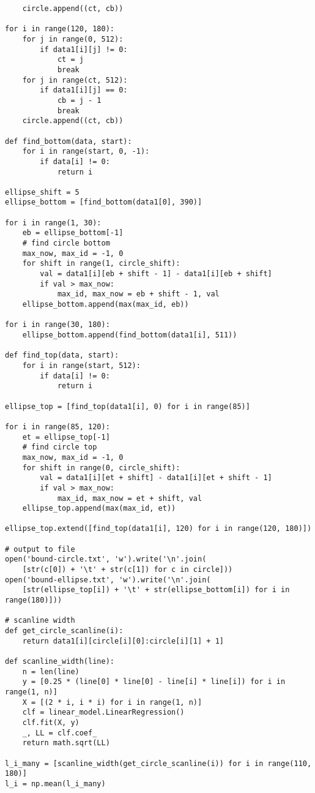 \begin{verbatim}
    circle.append((ct, cb))

for i in range(120, 180):
    for j in range(0, 512):
        if data1[i][j] != 0:
            ct = j
            break
    for j in range(ct, 512):
        if data1[i][j] == 0:
            cb = j - 1
            break
    circle.append((ct, cb))

def find_bottom(data, start):
    for i in range(start, 0, -1):
        if data[i] != 0:
            return i

ellipse_shift = 5
ellipse_bottom = [find_bottom(data1[0], 390)]

for i in range(1, 30):
    eb = ellipse_bottom[-1]
    # find circle bottom
    max_now, max_id = -1, 0
    for shift in range(1, circle_shift):
        val = data1[i][eb + shift - 1] - data1[i][eb + shift]
        if val > max_now:
            max_id, max_now = eb + shift - 1, val
    ellipse_bottom.append(max(max_id, eb))

for i in range(30, 180):
    ellipse_bottom.append(find_bottom(data1[i], 511))

def find_top(data, start):
    for i in range(start, 512):
        if data[i] != 0:
            return i

ellipse_top = [find_top(data1[i], 0) for i in range(85)]

for i in range(85, 120):
    et = ellipse_top[-1]
    # find circle top
    max_now, max_id = -1, 0
    for shift in range(0, circle_shift):
        val = data1[i][et + shift] - data1[i][et + shift - 1]
        if val > max_now:
            max_id, max_now = et + shift, val
    ellipse_top.append(max(max_id, et))

ellipse_top.extend([find_top(data1[i], 120) for i in range(120, 180)])

# output to file
open('bound-circle.txt', 'w').write('\n'.join(
    [str(c[0]) + '\t' + str(c[1]) for c in circle]))
open('bound-ellipse.txt', 'w').write('\n'.join(
    [str(ellipse_top[i]) + '\t' + str(ellipse_bottom[i]) for i in range(180)]))

# scanline width
def get_circle_scanline(i):
    return data1[i][circle[i][0]:circle[i][1] + 1]

def scanline_width(line):
    n = len(line)
    y = [0.25 * (line[0] * line[0] - line[i] * line[i]) for i in range(1, n)]
    X = [(2 * i, i * i) for i in range(1, n)]
    clf = linear_model.LinearRegression()
    clf.fit(X, y)
    _, LL = clf.coef_
    return math.sqrt(LL)

l_i_many = [scanline_width(get_circle_scanline(i)) for i in range(110, 180)]
l_i = np.mean(l_i_many)


\end{verbatim}
